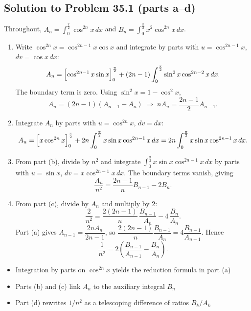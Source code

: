 
\subsection{Solution to Problem 35.1 (parts a--d)}

\begin{solution}
Throughout, $A_n = \displaystyle\int_{0}^{\frac{\pi}{2}} \cos^{2n} x \, dx$ and $B_n = \displaystyle\int_{0}^{\frac{\pi}{2}} x^2 \cos^{2n} x \, dx$.

\begin{enumerate}
\item[(a)] Write $\cos^{2n} x = \cos^{2n-1} x \cos x$ and integrate by parts with $u = \cos^{2n-1} x$, $dv = \cos x \, dx$:
\[
A_n = \Bigl[\cos^{2n-1} x \sin x\Bigr]_{0}^{\frac{\pi}{2}}
+ (2n-1)\int_{0}^{\frac{\pi}{2}} \sin^2 x \cos^{2n-2} x \, dx.
\]
The boundary term is zero. Using $\sin^2 x = 1 - \cos^2 x$,
\[
A_n = (2n-1)(A_{n-1} - A_n)
\;\Longrightarrow\;
nA_n = \frac{2n-1}{2}A_{n-1}.
\]

\item[(b)] Integrate $A_n$ by parts with $u = \cos^{2n} x$, $dv = dx$:
\[
A_n = \Bigl[x\cos^{2n} x\Bigr]_{0}^{\frac{\pi}{2}}
+ 2n\int_{0}^{\frac{\pi}{2}} x\sin x \cos^{2n-1} x \, dx
= 2n\int_{0}^{\frac{\pi}{2}} x\sin x \cos^{2n-1} x \, dx.
\]

\item[(c)] From part (b), divide by $n^2$ and integrate
$\displaystyle\int_{0}^{\frac{\pi}{2}} x\sin x \cos^{2n-1} x \, dx$ by parts with $u = \sin x$, $dv = x\cos^{2n-1} x \, dx$.
The boundary terms vanish, giving
\[
\frac{A_n}{n^2} = \frac{2n-1}{n}B_{n-1} - 2B_n.
\]

\item[(d)] From part (c), divide by $A_n$ and multiply by $2$:
\[
\frac{2}{n^2} = \frac{2(2n-1)}{n}\,\frac{B_{n-1}}{A_n} - 4\,\frac{B_n}{A_n}.
\]
Part (a) gives $A_{n-1} = \dfrac{2nA_n}{2n-1}$, so $\dfrac{2(2n-1)}{n}\dfrac{B_{n-1}}{A_n} = 4\dfrac{B_{n-1}}{A_{n-1}}$. Hence
\[
\frac{1}{n^2} = 2\left(\frac{B_{n-1}}{A_{n-1}} - \frac{B_n}{A_n}\right).
\]
\end{enumerate}
\end{solution}

\begin{takeaways}
\begin{itemize}
    \item Integration by parts on $\cos^{2n} x$ yields the reduction formula in part (a)
    \item Parts (b) and (c) link $A_n$ to the auxiliary integral $B_n$
    \item Part (d) rewrites $1/n^2$ as a telescoping difference of ratios $B_k/A_k$
\end{itemize}
\end{takeaways}
